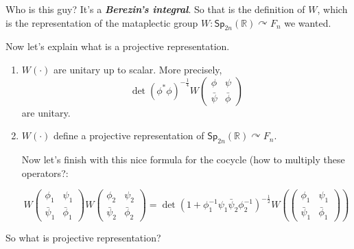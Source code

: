 {\color{8}Who is this guy?} It's a \textit{\textbf{Berezin's integral}}. So that is the definition of $W$, which is the representation of the mataplectic group $W:\mathsf{Sp}_{2n}(\mathbb{R})\curvearrowright F_n$ we wanted.

Now let's explain what is a projective representation.

\begin{thm}\leavevmode
\begin{enumerate}

	\item 
$W(\cdot )$ are unitary up to scalar. More precisely,
	\[\det (\phi^*\phi)^{-\frac{1}{4}} W \begin{pmatrix} \phi&\psi\\\bar{\psi} &\bar{\phi}  \end{pmatrix} \]
	are unitary.

	\item $W(\cdot )$ define a projective representation of $\mathsf{Sp}_{2n}(\mathbb{R})\curvearrowright F_n$.

		Now let's finish with this nice formula for the cocycle (how to multiply these operators?:

	\[W \begin{pmatrix} \phi_1 &\psi_1\\\bar{\psi}_1 &\bar{\phi}_1 \end{pmatrix}W \begin{pmatrix} \phi_2&\psi_2\\\bar{\psi}_2&\bar{\phi}_2  \end{pmatrix} =\det (1+\phi_1^{-1}\psi_1\bar{\psi}_2\phi_2^{-1})^{-\frac{1}{2}} W\left( \begin{pmatrix} \phi_1&\psi_1\\\bar{\psi}_1&\bar{\phi}_1   \end{pmatrix}  \right)  \]
\end{enumerate}	\end{thm}

\begin{question}[Dani]\leavevmode
	So what is projective representation?
\end{question}














